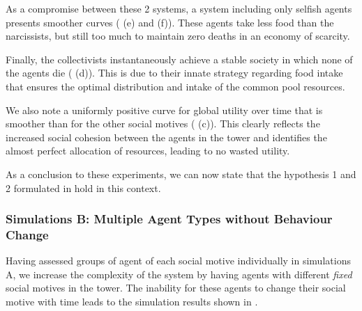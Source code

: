 As a compromise between these 2 systems, a system including only selfish agents presents smoother curves ( (e) and (f)). These agents take less food than the narcissists, but still too much to maintain zero deaths in an economy of scarcity.

Finally, the collectivists instantaneously achieve a stable society in which none of the agents die ( (d)). This is due to their innate strategy regarding food intake that ensures the optimal distribution and intake of the common pool resources.

We also note a uniformly positive curve for global utility over time that is smoother than for the other social motives ( (c)). This clearly reflects the increased social cohesion between the agents in the tower and identifies the almost perfect allocation of resources, leading to no wasted utility.

As a conclusion to these experiments, we can now state that the hypothesis 1 and 2 formulated in  hold in this context.

\subsubsection{Simulations B: Multiple Agent Types without Behaviour Change}

Having assessed groups of agent of each social motive individually in simulations A, we increase the complexity of the system by having agents with different \textit{fixed} social motives in the tower. The inability for these agents to change their social motive with time leads to the simulation results shown in .

